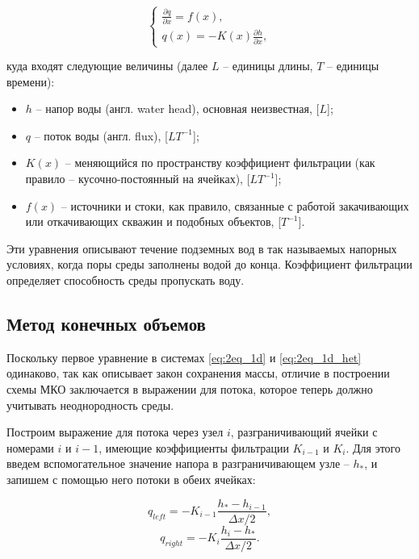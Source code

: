 \documentclass[a4paper, 11pt]{article}
\begin{document}
\begin{equation}\label{eq:2eq_1d_het}
	\begin{cases}
		\frac{\partial q}{\partial x} = f(x),\\
		q(x) = -K(x)\frac{\partial h}{\partial x},
	\end{cases}
\end{equation}

куда входят следующие величины (далее $L$ -- единицы длины, $T$ -- единицы времени):
\begin{itemize}
	\item $h$ -- напор воды (англ. water head), основная неизвестная, [$L$];
	\item $q$ -- поток воды (англ. flux), [$LT^{-1}$];
	\item $K(x)$ -- меняющийся по пространству коэффициент фильтрации (как правило -- кусочно-постоянный на ячейках), [$LT^{-1}$]; 
	\item $f(x)$ -- источники и стоки, как правило, связанные с работой закачивающих или откачивающих скважин и подобных объектов, [$T^{-1}$].
\end{itemize}

Эти уравнения описывают течение подземных вод в так называемых напорных условиях, когда поры среды заполнены водой до конца. Коэффициент фильтрации определяет способность среды пропускать воду.

\subsection{Метод конечных объемов}
Поскольку первое уравнение в системах \eqref{eq:2eq_1d} и \eqref{eq:2eq_1d_het} одинаково, так как описывает закон сохранения массы, отличие в построении схемы МКО заключается в выражении для потока, которое теперь должно учитывать неоднородность среды. 

Построим выражение для потока через узел $i$, разграничивающий ячейки с номерами $i$ и $i-1$, имеющие коэффициенты фильтрации $K_{i-1}$ и $K_i$. Для этого введем вспомогательное значение напора в разграничивающем узле -- $h_*$, и запишем с помощью него потоки в обеих ячейках:

\begin{equation}
	q_{left} = -K_{i-1}\frac{h_* - h_{i-1}}{\Delta x/2},
\end{equation}
\begin{equation}
	q_{right} = -K_i\frac{h_{i} - h_*}{\Delta x/2}.
\end{equation}
\end{document}

